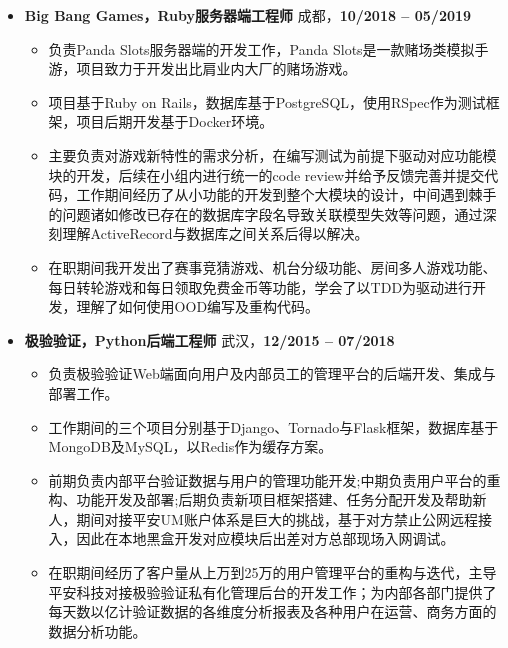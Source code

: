 \documentclass[11pt, a4paper,sans]{moderncv}   %
\begin{document}
\begin{itemize}

  \item{\yahei \textbf{Big Bang Games，Ruby服务器端工程师} \hfill 成都，\textbf{10/2018 -- 05/2019}}
  \begin{itemize}\yahei
    \item 负责Panda Slots服务器端的开发工作，Panda Slots是一款赌场类模拟手游，项目致力于开发出比肩业内大厂的赌场游戏。
    \item 项目基于Ruby on Rails，数据库基于PostgreSQL，使用RSpec作为测试框架，项目后期开发基于Docker环境。
    \item 主要负责对游戏新特性的需求分析，在编写测试为前提下驱动对应功能模块的开发，后续在小组内进行统一的code review并给予反馈完善并提交代码，工作期间经历了从小功能的开发到整个大模块的设计，中间遇到棘手的问题诸如修改已存在的数据库字段名导致关联模型失效等问题，通过深刻理解ActiveRecord与数据库之间关系后得以解决。
    \item 在职期间我开发出了赛事竞猜游戏、机台分级功能、房间多人游戏功能、每日转轮游戏和每日领取免费金币等功能，学会了以TDD为驱动进行开发，理解了如何使用OOD编写及重构代码。
  \end{itemize}

  \vspace{6pt}

  \item{\yahei \textbf{极验验证，Python后端工程师} \hfill 武汉，\textbf{12/2015 -- 07/2018}}

    \begin{itemize}\yahei
      \item 负责极验验证Web端面向用户及内部员工的管理平台的后端开发、集成与部署工作。
      \item 工作期间的三个项目分别基于Django、Tornado与Flask框架，数据库基于MongoDB及MySQL，以Redis作为缓存方案。
      \item 前期负责内部平台验证数据与用户的管理功能开发;中期负责用户平台的重构、功能开发及部署;后期负责新项目框架搭建、任务分配开发及帮助新人，期间对接平安UM账户体系是巨大的挑战，基于对方禁止公网远程接入，因此在本地黑盒开发对应模块后出差对方总部现场入网调试。
      \item 在职期间经历了客户量从上万到25万的用户管理平台的重构与迭代，主导平安科技对接极验验证私有化管理后台的开发工作；为内部各部门提供了每天数以亿计验证数据的各维度分析报表及各种用户在运营、商务方面的数据分析功能。
    \end{itemize}

\end{itemize}
\vspace{-8pt}
\end{document}
